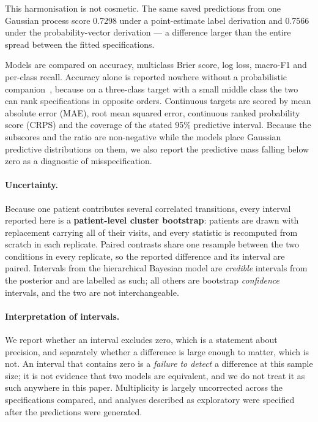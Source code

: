 \documentclass[11pt]{article}
\begin{document}
This harmonisation is not cosmetic. The same saved predictions from one Gaussian
process score 0.7298 under a point-estimate label derivation and 0.7566 under
the probability-vector derivation --- a difference larger than the entire spread
between the fitted specifications.

Models are compared on accuracy, multiclass Brier score, log loss, macro-F1 and
per-class recall. Accuracy alone is reported nowhere without a probabilistic
companion~\citep{gneiting2007,vancalster2019}, because on a three-class target
with a small middle class the two can rank specifications in opposite orders.
Continuous targets are scored by mean absolute error (MAE), root mean squared
error, continuous ranked probability score (CRPS) and the coverage of the stated
95\% predictive interval. Because the subscores and the ratio are non-negative
while the models place Gaussian predictive distributions on them, we also report
the predictive mass falling below zero as a diagnostic of misspecification.

\paragraph{Uncertainty.}
Because one patient contributes several correlated transitions, every interval
reported here is a \textbf{patient-level cluster bootstrap}: patients are drawn
with replacement carrying all of their visits, and every statistic is recomputed
from scratch in each replicate. Paired contrasts share one resample between the
two conditions in every replicate, so the reported difference and its interval
are paired. Intervals from the hierarchical Bayesian model are \emph{credible}
intervals from the posterior and are labelled as such; all others are bootstrap
\emph{confidence} intervals, and the two are not interchangeable.

\paragraph{Interpretation of intervals.}
We report whether an interval excludes zero, which is a statement about
precision, and separately whether a difference is large enough to matter, which
is not. An interval that contains zero is a \emph{failure to detect} a
difference at this sample size; it is not evidence that two models are
equivalent, and we do not treat it as such anywhere in this paper. Multiplicity
is largely uncorrected across the specifications compared, and analyses
described as exploratory were specified after the predictions were generated.
\end{document}
